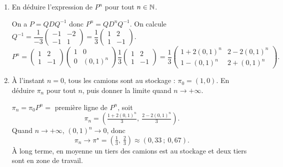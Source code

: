 \begin{enumerate}[label=\alph*), itemsep=0.6em]
\begin{solution}
D'où $Q = \begin{pmatrix} 1 & 2 \\ 1 & -1 \end{pmatrix}$ et $D = \begin{pmatrix} 1 & 0 \\ 0 & 0{,}1 \end{pmatrix}$.
\end{solution}

  \item En déduire l'expression de $P^n$ pour tout $n \in \mathbb{N}$.

\begin{solution}
On a $P = QDQ^{-1}$ donc $P^n = Q D^n Q^{-1}$. On calcule $Q^{-1} = \dfrac{1}{-3}\begin{pmatrix} -1 & -2 \\ -1 & 1 \end{pmatrix} = \dfrac{1}{3}\begin{pmatrix} 1 & 2 \\ 1 & -1 \end{pmatrix}$.
\[
P^n = \begin{pmatrix} 1 & 2 \\ 1 & -1 \end{pmatrix}
      \begin{pmatrix} 1 & 0 \\ 0 & (0{,}1)^n \end{pmatrix}
      \frac{1}{3}\begin{pmatrix} 1 & 2 \\ 1 & -1 \end{pmatrix}
= \frac{1}{3}\begin{pmatrix} 1 + 2(0{,}1)^n & 2 - 2(0{,}1)^n \\ 1 - (0{,}1)^n & 2 + (0{,}1)^n \end{pmatrix}.
\]
\end{solution}

  \item À l'instant $n = 0$, tous les camions sont au stockage : $\pi_0 = (1, 0)$. En déduire $\pi_n$ pour tout $n$, puis donner la limite quand $n \to +\infty$.

\begin{solution}
$\pi_n = \pi_0 P^n = $ première ligne de $P^n$, soit
\[
  \pi_n = \left( \tfrac{1 + 2(0{,}1)^n}{3},\ \tfrac{2 - 2(0{,}1)^n}{3} \right).
\]
Quand $n \to +\infty$, $(0{,}1)^n \to 0$, donc
\[
  \pi_n \longrightarrow \pi^\star = \left( \tfrac{1}{3},\ \tfrac{2}{3} \right) \approx (0{,}33\ ;\ 0{,}67).
\]
À long terme, en moyenne un tiers des camions est au stockage et deux tiers sont en zone de travail.
\end{solution}


\end{enumerate}
